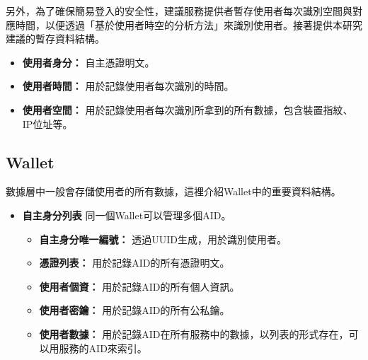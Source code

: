 另外，為了確保簡易登入的安全性，建議服務提供者暫存使用者每次識別空間與對應時間，以便透過「基於使用者時空的分析方法」來識別使用者。接著提供本研究建議的暫存資料結構。
\begin{itemize}
  \item \textbf{使用者身分：} 自主憑證明文。
  \item \textbf{使用者時間：} 用於記錄使用者每次識別的時間。
  \item \textbf{使用者空間：} 用於記錄使用者每次識別所拿到的所有數據，包含裝置指紋、IP位址等。
\end{itemize}
\subsection{Wallet}
數據層中一般會存儲使用者的所有數據，這裡介紹Wallet中的重要資料結構。
\begin{itemize}
  \item \textbf{自主身分列表} 同一個Wallet可以管理多個AID。
        \begin{itemize}
          \item \textbf{自主身分唯一編號：} 透過UUID生成，用於識別使用者。
          \item \textbf{憑證列表：} 用於記錄AID的所有憑證明文。
          \item \textbf{使用者個資：} 用於記錄AID的所有個人資訊。
          \item \textbf{使用者密鑰：} 用於記錄AID的所有公私鑰。
          \item \textbf{使用者數據：} 用於記錄AID在所有服務中的數據，以列表的形式存在，可以用服務的AID來索引。
        \end{itemize}
\end{itemize}
